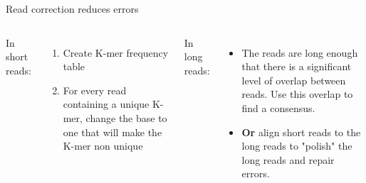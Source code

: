\documentclass{beamer}
\begin{document}

\begin{frame}{Read correction reduces errors}
\begin{columns}
In short reads:
\begin{enumerate}
	\item Create K-mer frequency table
	\item For every read containing a unique K-mer, change the base to one that will make the K-mer non unique
\end{enumerate}
In long reads:
\begin{itemize}
	\item The reads are long enough that there is a significant level of overlap between reads. Use this overlap to find a consensus.
	\item \textbf{Or} align short reads to the long reads to "polish" the long reads and repair errors.
\end{itemize}
\end{columns}
\end{frame}

\end{document}
